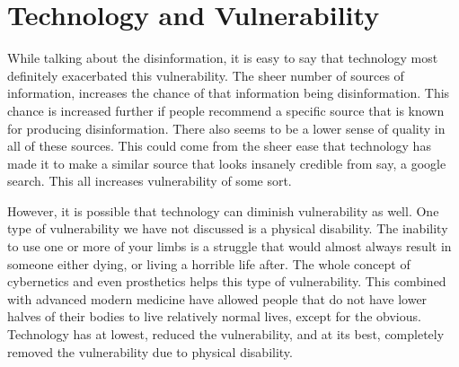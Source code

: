 \documentclass[12pt]{article}
\begin{document}
\section{Technology and Vulnerability}
While talking about the disinformation, it is easy to say that technology most definitely exacerbated this vulnerability. The sheer number of sources of information, increases the chance of that information being disinformation. This chance is increased further if people recommend a specific source that is known for producing disinformation. There also seems to be a lower sense of quality in all of these sources. This could come from the sheer ease that technology has made it to make a similar source that looks insanely credible from say, a google search. This all increases vulnerability of some sort.

However, it is possible that technology can diminish vulnerability as well. One type of vulnerability we have not discussed is a physical disability. The inability to use one or more of your limbs is a struggle that would almost always result in someone either dying, or living a horrible life after. The whole concept of cybernetics and even prosthetics helps this type of vulnerability. This combined with advanced modern medicine have allowed people that do not have lower halves of their bodies to live relatively normal lives, except for the obvious. Technology has at lowest, reduced the vulnerability, and at its best, completely removed the vulnerability due to physical disability. 
\end{document}

